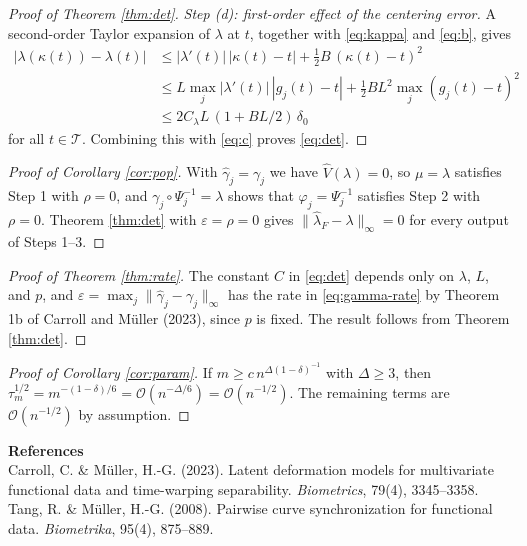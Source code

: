 \documentclass[11pt]{article}
\newcommand{\T}{\mathcal{T}}
\newcommand{\lhat}{\hat{\lambda}}
\newcommand{\ghat}{\hat{\gamma}}
\newcommand{\norm}[1]{\|#1\|_\infty}
\begin{document}
\begin{proof}[Proof of Theorem \ref{thm:det}]
\emph{Step (d): first-order effect of the centering error.} A second-order Taylor expansion
of $\lambda$ at $t$, together with \eqref{eq:kappa} and \eqref{eq:b}, gives
\begin{align*}
  |\lambda(\kappa(t)) - \lambda(t)|
  &\le |\lambda'(t)|\,|\kappa(t)-t| + \tfrac{1}{2}B\,(\kappa(t)-t)^2\\
  &\le L\max_j |\lambda'(t)|\,|g_j(t)-t| + \tfrac{1}{2}BL^2\max_j (g_j(t)-t)^2\\
  &\le 2C_\lambda L\,(1 + BL/2)\,\delta_0
\end{align*}
for all $t \in \T$. Combining this with \eqref{eq:c} proves \eqref{eq:det}.
\end{proof}

\begin{proof}[Proof of Corollary \ref{cor:pop}]
With $\ghat_j = \gamma_j$ we have $\hat{V}(\lambda) = 0$, so $\mu = \lambda$ satisfies Step 1
with $\rho = 0$, and $\gamma_j\circ\Psi_j^{-1} = \lambda$ shows that $\varphi_j = \Psi_j^{-1}$
satisfies Step 2 with $\rho = 0$. Theorem \ref{thm:det} with $\varepsilon = \rho = 0$ gives
$\norm{\lhat_F - \lambda} = 0$ for every output of Steps 1--3.
\end{proof}

\begin{proof}[Proof of Theorem \ref{thm:rate}]
The constant $C$ in \eqref{eq:det} depends only on $\lambda$, $L$, and $p$, and
$\varepsilon = \max_j\norm{\ghat_j-\gamma_j}$ has the rate in \eqref{eq:gamma-rate} by
Theorem 1b of Carroll and M\"{u}ller (2023), since $p$ is fixed. The result follows from
Theorem \ref{thm:det}.
\end{proof}

\begin{proof}[Proof of Corollary \ref{cor:param}]
If $m \ge c\,n^{\Delta(1-\delta)^{-1}}$ with $\Delta \ge 3$, then
$\tau_m^{1/2} = m^{-(1-\delta)/6} = \mathcal{O}(n^{-\Delta/6}) = \mathcal{O}(n^{-1/2})$. The
remaining terms are $\mathcal{O}(n^{-1/2})$ by assumption.
\end{proof}

\bigskip
\noindent\textbf{References}\\[4pt]
Carroll, C. \& M\"{u}ller, H.-G. (2023). Latent deformation models for
multivariate functional data and time-warping separability.
\textit{Biometrics}, 79(4), 3345--3358.\\[4pt]
Tang, R. \& M\"{u}ller, H.-G. (2008). Pairwise curve synchronization for functional data.
\textit{Biometrika}, 95(4), 875--889.
\end{document}

